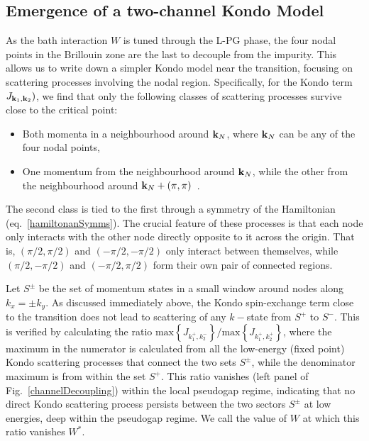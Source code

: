 \documentclass[reprint,hidelinks,onecolumn]{revtex4-2}
\begin{document}
\subsection{Emergence of a two-channel Kondo Model}\label{2CKEmerge}
As the bath interaction \(W\) is tuned through the L-PG phase, the four nodal points in the Brillouin zone are the last to decouple from the impurity. This allows us to write down a simpler Kondo model near the transition, focusing on scattering processes involving the nodal region. Specifically, for the Kondo term \(J_{{\bf k}_1, {\bf k}_2})\), we find that only the following classes of scattering processes survive close to the critical point:
\begin{itemize}
	\item Both momenta in a neighbourhood around \({\bf k}_N\), where \({\bf k}_N\) can be any of the four nodal points,
	\item One momentum from the neighbourhood around \({\bf k}_N\), while the other from the neighbourhood around \({\bf k}_N + \left( \pi, \pi \right) \)~.
\end{itemize}
The second class is tied to the first through a symmetry of the Hamiltonian (eq.~\ref{hamiltonanSymms}). The crucial feature of these processes is that each node only interacts with the other node directly opposite to it across the origin. That is, \(\left(\pi/2, \pi/2\right) \) and \(\left(-\pi/2, -\pi/2\right) \) only interact between themselves, while \(\left(\pi/2, -\pi/2\right) \) and \(\left(-\pi/2, \pi/2\right) \) form their own pair of connected regions. 

Let \(S^\pm\) be the set of momentum states in a small window around nodes along \(k_x = \pm k_y\). As discussed immediately above, the Kondo spin-exchange term close to the transition does not lead to scattering of any \(k-\)state from \(S^+\) to \(S^-\). This is verified by calculating the ratio \(\text{max}\left\{ J_{k^+_1, k^-_2} \right\} / \text{max}\left\{ J_{k^+_1, k^+_2} \right\}\), where the maximum in the numerator is calculated from all the low-energy (fixed point) Kondo scattering processes that connect the two sets \(S^\pm\), while the denominator maximum is from within the set \(S^+\). This ratio vanishes (left panel of Fig.~\ref{channelDecoupling}) within the local pseudogap regime, indicating that no direct Kondo scattering process persists between the two sectors \(S^\pm\) at low energies, deep within the pseudogap regime. We call the value of \(W\) at which this ratio vanishes \(W^*\).
\end{document}
